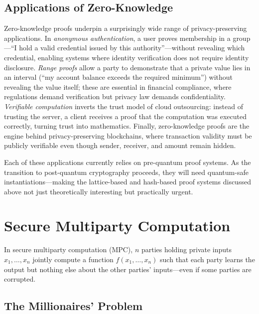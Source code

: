 \subsection{Applications of Zero-Knowledge}
\label{subsec:zk-applications}

Zero-knowledge proofs underpin a surprisingly wide range of privacy-preserving applications.  In \emph{anonymous authentication}, a user proves membership in a group---``I hold a valid credential issued by this authority''---without revealing which credential, enabling systems where identity verification does not require identity disclosure.  \emph{Range proofs} allow a party to demonstrate that a private value lies in an interval (``my account balance exceeds the required minimum'') without revealing the value itself; these are essential in financial compliance, where regulations demand verification but privacy law demands confidentiality.  \emph{Verifiable computation} inverts the trust model of cloud outsourcing: instead of trusting the server, a client receives a proof that the computation was executed correctly, turning trust into mathematics.  Finally, zero-knowledge proofs are the engine behind privacy-preserving blockchains, where transaction validity must be publicly verifiable even though sender, receiver, and amount remain hidden.

Each of these applications currently relies on pre-quantum proof systems.  As the transition to post-quantum cryptography proceeds, they will need quantum-safe instantiations---making the lattice-based and hash-based proof systems discussed above not just theoretically interesting but practically urgent.


\section{Secure Multiparty Computation}
\label{sec:mpc}

In secure multiparty computation (MPC), $n$ parties holding private inputs $x_1, \ldots, x_n$ jointly compute a function $f(x_1, \ldots, x_n)$ such that each party learns the output but nothing else about the other parties' inputs---even if some parties are corrupted.

\subsection{The Millionaires' Problem}
\label{subsec:millionaires}

